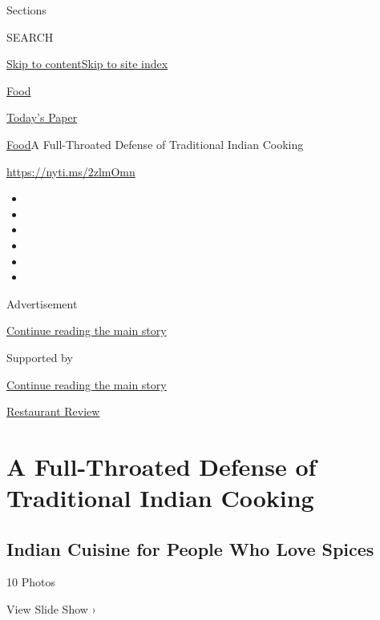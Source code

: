 Sections

SEARCH

\protect\hyperlink{site-content}{Skip to
content}\protect\hyperlink{site-index}{Skip to site index}

\href{https://www.nytimes3xbfgragh.onion/section/food}{Food}

\href{https://myaccount.nytimes3xbfgragh.onion/auth/login?response_type=cookie\&client_id=vi}{}

\href{https://www.nytimes3xbfgragh.onion/section/todayspaper}{Today's
Paper}

\href{/section/food}{Food}\textbar{}A Full-Throated Defense of
Traditional Indian Cooking

\url{https://nyti.ms/2zlmOmn}

\begin{itemize}
\item
\item
\item
\item
\item
\item
\end{itemize}

Advertisement

\protect\hyperlink{after-top}{Continue reading the main story}

Supported by

\protect\hyperlink{after-sponsor}{Continue reading the main story}

\href{/column/restaurant-review}{Restaurant Review}

\hypertarget{a-full-throated-defense-of-traditional-indian-cooking}{%
\section{A Full-Throated Defense of Traditional Indian
Cooking}\label{a-full-throated-defense-of-traditional-indian-cooking}}

\href{https://www.nytimes3xbfgragh.onion/slideshow/2018/11/20/dining/adda-indian-restaurant-nyc.html}{}

\hypertarget{indian-cuisine-for-people-who-love-spices}{%
\subsection{Indian Cuisine for People Who Love
Spices}\label{indian-cuisine-for-people-who-love-spices}}

10 Photos

View Slide Show ›

